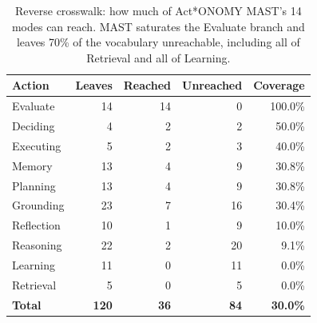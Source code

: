 \begin{table}[t]
\centering
\small
\caption{Reverse crosswalk: how much of Act*ONOMY MAST's 14
modes can reach. MAST saturates the Evaluate branch and leaves 70\% of the
vocabulary unreachable, including all of Retrieval and all of Learning.}
\label{tab:crosswalk-reverse}
\begin{tabular}{@{}lrrrr@{}}
\toprule
\textbf{Action} & \textbf{Leaves} & \textbf{Reached} & \textbf{Unreached} & \textbf{Coverage} \\
\midrule
Evaluate    & 14  & 14 & 0  & 100.0\% \\
Deciding    & 4   & 2  & 2  & 50.0\%  \\
Executing   & 5   & 2  & 3  & 40.0\%  \\
Memory      & 13  & 4  & 9  & 30.8\%  \\
Planning    & 13  & 4  & 9  & 30.8\%  \\
Grounding   & 23  & 7  & 16 & 30.4\%  \\
Reflection  & 10  & 1  & 9  & 10.0\%  \\
Reasoning   & 22  & 2  & 20 & 9.1\%   \\
Learning    & 11  & 0  & 11 & 0.0\%   \\
Retrieval   & 5   & 0  & 5  & 0.0\%   \\
\midrule
\textbf{Total} & \textbf{120} & \textbf{36} & \textbf{84} & \textbf{30.0\%} \\
\bottomrule
\end{tabular}
\end{table}


